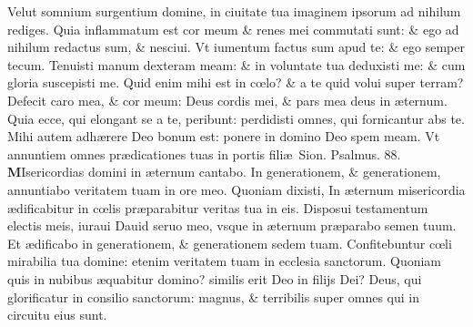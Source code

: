 \documentclass[a5paper,10pt]{book}
\def\ae{æ}
\def\oe{œ}
\begin{document}
\begin{multicols*}{2}
\newline \color{red} V\color{black}elut somnium surgentium domine, in ciuitate tua imaginem ipsorum ad nihilum rediges.
\newline \color{red} Q\color{black}uia inflammatum est cor meum \& renes mei commutati sunt: \& ego ad nihilum redactus sum, \& nesciui.
\newline \color{red} V\color{black}t iumentum factus sum apud te: \& ego semper tecum.
\newline \color{red} T\color{black}enuisti manum dexteram meam: \& in voluntate tua deduxisti me: \& cum gloria suscepisti me.
\newline \color{red} Q\color{black}uid enim mihi est in c\oe lo? \& a te quid volui super terram?
\newline \color{red} D\color{black}efecit caro mea, \& cor meum: Deus cordis mei, \& pars mea deus in \ae ternum.
\newline \color{red} Q\color{black}uia ecce, qui elongant se a te, peribunt: perdidisti omnes, qui fornicantur abs te.
\newline \color{red} M\color{black}ihi autem adh\ae rere Deo bonum est: ponere in domino Deo spem meam.
\newline \color{red} V\color{black}t annuntiem omnes pr\ae dicationes tuas in portis fili\ae \ Sion. \color{red} Psalmus. \hypertarget{ps88}{88.} \color{black}
\vspace{-1em}
\lettrine[lines=2]{\bfseries \color{red} M}{}Isericordias domini in \ae ternum cantabo.
\newline \color{red} I\color{black}n generationem, \& generationem, annuntiabo veritatem tuam in ore meo.
\newline \color{red} Q\color{black}uoniam dixisti, In \ae ternum misericordia \ae dificabitur in c\oe lis pr\ae parabitur veritas tua in eis.
\newline \color{red} D\color{black}isposui testamentum electis meis, iuraui Dauid seruo meo, vsque in \ae ternum pr\ae parabo semen tuum.
\newline \color{red} E\color{black}t \ae dificabo in generationem, \& generationem sedem tuam.
\newline \color{red} C\color{black}onfitebuntur c\oe li mirabilia tua domine: etenim veritatem tuam in ecclesia sanctorum.
\newline \color{red} Q\color{black}uoniam quis in nubibus \ae quabitur domino? similis erit Deo in filijs Dei?
\newline \color{red} D\color{black}eus, qui glorificatur in consilio sanctorum: magnus, \& terribilis super omnes qui in circuitu eius sunt.

\end{multicols*}
\end{document}
